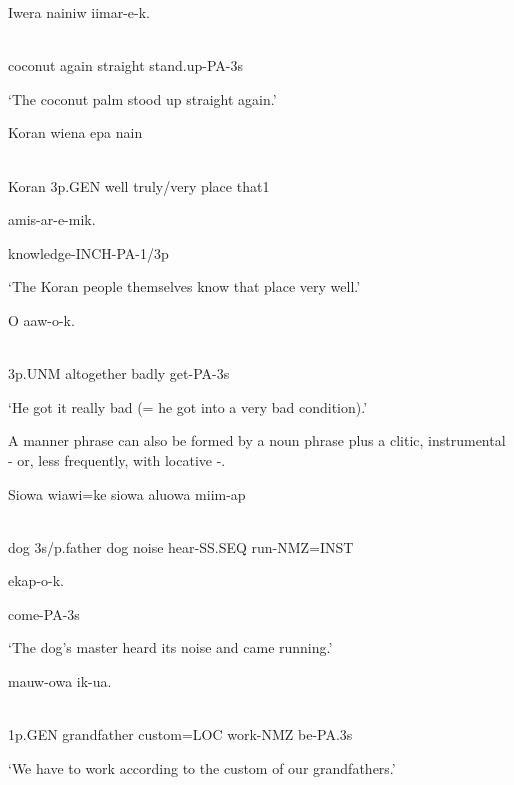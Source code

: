 \ea%
\label{ex:x880}
\gll Iwera  nainiw    iimar-e-k. \\
      \\
\glt
\z

coconut  again  straight  stand.up-PA-3s

`The coconut palm stood up straight again.'

\ea%
\label{ex:x879}
\gll Koran  wiena    epa  nain  \\
      \\
\glt
\z

Koran  3p.GEN  well  truly/very  place  that1  

amis-ar-e-mik.

knowledge-INCH-PA-1/3p

`The Koran people themselves know that place very well.'

\ea%
\label{ex:x881}
\gll O    aaw-o-k.  \\
      \\
\glt
\z

3p.UNM  altogether  badly  get-PA-3s

`He got it really bad (= he got into a very bad condition).'

A manner phrase can also be formed by a noun phrase plus a clitic, instrumental \nobreakdash- or, less frequently, with locative -.  

\ea%
\label{ex:x882}
\gll Siowa  wiawi=ke  siowa  aluowa  miim-ap   \\
      \\
\glt
\z

dog  3s/p.father  dog  noise  hear-SS.SEQ  run-NMZ=INST  

ekap-o-k.

come-PA-3s

`The dog's master heard its noise and came running.'

\ea%
\label{ex:x884}
\gll {}  mauw-owa  ik-ua. \\
      \\
\glt
\z

1p.GEN  grandfather  custom=LOC  work-NMZ  be-PA.3s

`We have to work according to the custom of our grandfathers.'

